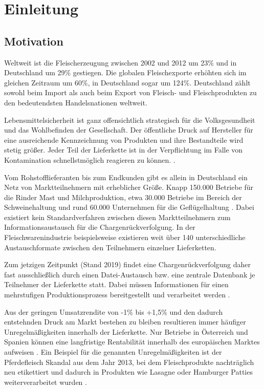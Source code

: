 \section{Einleitung}

\subsection{Motivation} \label{Motivation}

\begin{displayquote}
  \glqq Weltweit ist die Fleischerzeugung zwischen 2002 und 2012 um 23\% und in Deutschland um 29\% gestiegen. Die globalen Fleischexporte erhöhten sich im gleichen Zeitraum um 60\%, in Deutschland sogar um 124\%. Deutschland zählt sowohl beim Import als auch beim Export von Fleisch- und Fleischprodukten zu den bedeutendsten Handelsnationen weltweit.\grqq{}
\end{displayquote}

\begin{flushright}
  \citet{Efken2015}
\end{flushright}

Lebensmittelsicherheit ist ganz offensichtlich strategisch für die Volksgesundheit und das Wohlbefinden der Gesellschaft. Der öffentliche Druck auf Hersteller für eine ausreichende Kennzeichnung von Produkten und ihre Bestandteile wird stetig größer. Jeder Teil der Lieferkette ist in der Verpflichtung im Falle von Kontamination schnellstmöglich reagieren zu können. \citep{EPER2002}.

Vom Rohstofflieferanten bis zum Endkunden gibt es allein in Deutschland ein Netz von Marktteilnehmern mit erheblicher Größe. Knapp 150.000 Betriebe für die Rinder Mast und Milchproduktion, etwa 30.000 Betriebe im Bereich der Schweinehaltung und rund 60.000 Unternehmen für die Geflügelhaltung \citep{Efken2015}. Dabei existiert kein Standardverfahren zwischen diesen Marktteilnehmern zum Informationsaustausch für die Chargenrückverfolgung. In der Fleischwarenindustrie beispielsweise existieren weit über 140 unterschiedliche Austauschformate zwischen den Teilnehmern einzelner Lieferketten.

Zum jetzigen Zeitpunkt (Stand 2019) findet eine Chargenrückverfolgung daher fast ausschließlich durch einen Datei-Austausch bzw. eine zentrale Datenbank je Teilnehmer der Lieferkette statt. Dabei müssen Informationen für einen mehrstufigen Produktionsprozess bereitgestellt und verarbeitet werden \citep{Siepermann2015}.

Aus der geringen Umsatzrendite von -1\% bis +1,5\%  und den dadurch entstehnden Druck am Markt bestehen zu bleiben resultieren immer häufiger Unregelmäßigkeiten innerhalb der Lieferkette. Nur Betriebe in Österreich und Spanien können eine langfristige Rentabilität innerhalb des europäischen Marktes aufweisen \citep{Efken2015}. Ein Beispiel für die genannten Unregelmäßigkeiten ist der Pferdefleisch Skandal aus dem Jahr 2013, bei dem Fleischprodukte nachträglich neu etikettiert und dadurch in Produkten wie Lasagne oder Hamburger Patties weiterverarbeitet wurden \citep{Bundespartei}.

